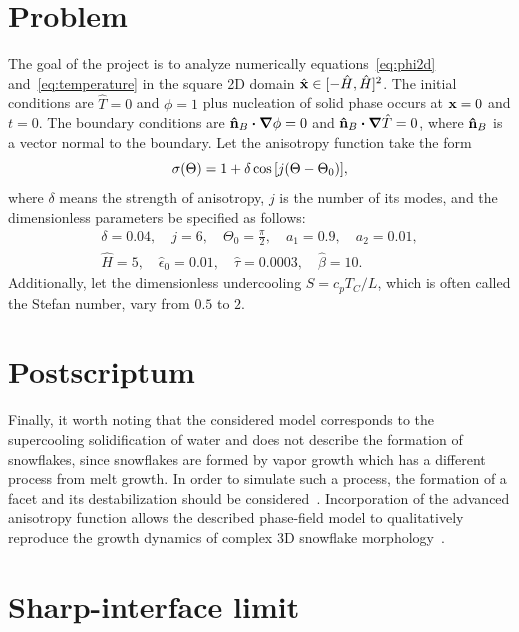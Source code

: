\documentclass{article}
\begin{document}
\section{Problem}

The goal of the project is to analyze numerically equations~\eqref{eq:phi2d} and~\eqref{eq:temperature}
in the square 2D domain $\hat{\vb{x}}\in[-\hat{H},\hat{H}]^2$.
The initial conditions are $\hat{T}=0$ and $\phi=1$ plus nucleation of solid phase occurs at $\vb{x}=0$ and $t=0$.
The boundary conditions are $\vu{n}_B\vdot\grad\phi=0$ and $\vu{n}_B\vdot\grad\hat{T}=0$,
where $\vu{n}_B$ is a vector normal to the boundary.
Let the anisotropy function take the form
\begin{equation}\label{eq:sigma}
    \sigma(\Theta) = 1 + \delta\cos\qty[j(\Theta-\Theta_0)],
\end{equation}
where $\delta$ means the strength of anisotropy, $j$ is the number of its modes,
and the dimensionless parameters be specified as follows:
\begin{equation}\label{eq:parameters}
    \begin{gathered}
    \delta=0.04, \quad j=6, \quad \Theta_0=\frac{\pi}2, \quad a_1=0.9, \quad a_2 = 0.01, \\
    \hat{H} = 5, \quad \hat{\epsilon}_0 = 0.01, \quad \hat{\tau} = 0.0003, \quad \hat{\beta} = 10.
    \end{gathered}
\end{equation}
Additionally, let the dimensionless undercooling $S = c_p T_C/L$,
which is often called the Stefan number, vary from $0.5$ to $2$.

\section{Postscriptum}

Finally, it worth noting that the considered model corresponds to the supercooling solidification of water
and does not describe the formation of snowflakes,
since snowflakes are formed by vapor growth which has a different process from melt growth.
In order to simulate such a process, the formation of a facet
and its destabilization should be considered~\cite{yokoyama1990pattern}.
Incorporation of the advanced anisotropy function allows the described phase-field model
to qualitatively reproduce the growth dynamics of complex 3D snowflake morphology~\cite{demange2017phase}.

\appendix

\section{Sharp-interface limit}
\end{document}
